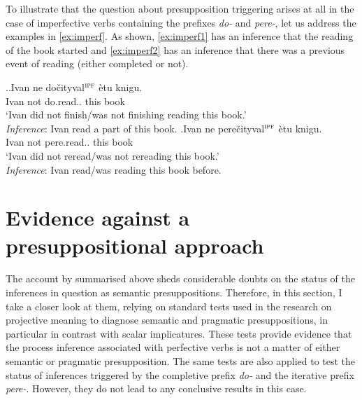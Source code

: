 
To illustrate that the question about presupposition triggering arises at all in the case of imperfective verbs containing the prefixes \textit{do-} and \textit{pere-}, let us address the examples in \ref{ex:imperf}. As shown,  \ref{ex:imperf1} has an inference that the reading of the book started and \ref{ex:imperf2} has an inference that there was a previous event of reading (either completed or not).

\ex.\label{ex:imperf}\ag.\label{ex:imperf1}Ivan ne do\v{c}ityval$^{\textsc{ipf}}$ \`{e}tu knigu.\\
Ivan not do.read.. this book\\
\trans `Ivan did not finish/was not finishing reading this book.'\\
\textit{Inference}: Ivan read a part of this book.
\bg.\label{ex:imperf2}Ivan ne pere\v{c}ityval$^{\textsc{ipf}}$ \`{e}tu knigu.\\
Ivan not pere.read.. this book\\
\trans `Ivan did not reread/was not rereading this book.'\\
\textit{Inference}: Ivan read/was reading this book before.

\section{Evidence against a presuppositional approach}\label{sec:pragm:tests}
The account by \citet{Gronn:04, Gronn:06} summarised above sheds considerable doubts on the status of the inferences in question as semantic presuppositions. Therefore, in this section, I take a closer look at them, relying on standard tests used in the research on projective meaning to diagnose semantic and pragmatic presuppositions, in particular in contrast with scalar implicatures. These tests provide evidence that the process inference associated with perfective verbs is not a matter of either semantic or pragmatic presupposition. The same tests are also applied to test the status of inferences triggered by the completive prefix \textit{do-} and the iterative prefix \textit{pere-}. However, they do not lead to any conclusive results in this case.
